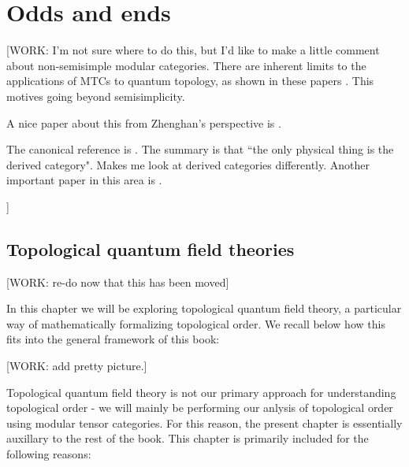 \section{Odds and ends}

[WORK: I'm not sure where to do this, but I'd like to make a little comment about non-semisimple modular categories. There are inherent limits to the applications of MTCs to quantum topology, as shown in these papers \cite{reutter2023semisimple, davis2011axiomatic}. This motives going beyond semisimplicity.

A nice paper about this from Zhenghan's perspective is \cite{chang2024modular}.

The canonical reference is \cite{creutzig2021qft}. The summary is that ``the only physical thing is the derived category". Makes me look at derived categories differently. Another important paper in this area is \cite{shimizu2019non}.

 ]


\subsection{Topological quantum field theories}

[WORK: re-do now that this has been moved]

In this chapter we will be exploring topological quantum field theory, a particular way of mathematically formalizing topological order. We recall below how this fits into the general framework of this book:

[WORK: add pretty picture.]

Topological quantum field theory is not our primary approach for understanding topological order - we will mainly be performing our anlysis of topological order using modular tensor categories. For this reason, the present chapter is essentially auxillary to the rest of the book. This chapter is primarily included for the following reasons:


